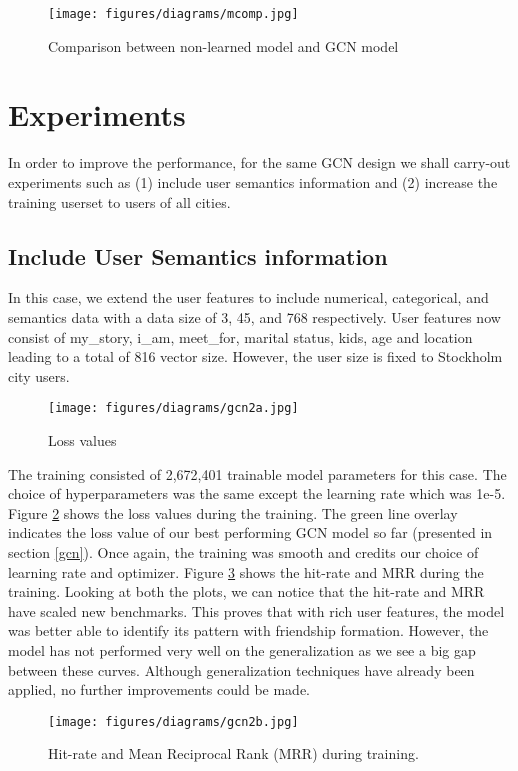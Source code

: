 \documentclass{kththesis}
\begin{document}
\begin{figure}[h!]
\centering
\texttt{[image: figures/diagrams/mcomp.jpg]}
\caption{Comparison between non-learned model and GCN model}
\label{fig:mcomp}
\end{figure}
\section{Experiments}
In order to improve the performance, for the same GCN design we shall carry-out experiments such as (1) include user semantics information and (2) increase the training userset to users of all cities.
\subsection{Include User Semantics information}
In this case, we extend the user features to include numerical, categorical, and semantics data with a data size of 3, 45, and 768 respectively. User features now consist of my\_story, i\_am, meet\_for, marital status, kids, age and location leading to a total of 816 vector size. However, the user size is fixed to Stockholm city users. \\

\begin{figure}[h!]
\centering
\texttt{[image: figures/diagrams/gcn2a.jpg]}
\caption{Loss values}
\label{fig:gcn2a}
\end{figure}

The training consisted of 2,672,401 trainable model parameters for this case. The choice of hyperparameters was the same except the learning rate which was 1e-5. Figure \ref{fig:gcn2a} shows the loss values during the training. The green line overlay indicates the loss value of our best performing GCN model so far (presented in section \ref{gcn}). Once again, the training was smooth and credits our choice of learning rate and optimizer. Figure \ref{fig:gcn2b} shows the hit-rate and MRR during the training. Looking at both the plots, we can notice that the hit-rate and MRR have scaled new benchmarks. This proves that with rich user features, the model was better able to identify its pattern with friendship formation. However, the model has not performed very well on the generalization as we see a big gap between these curves. Although generalization techniques have already been applied, no further improvements could be made. \\

\begin{figure}[h!]
\centering
\texttt{[image: figures/diagrams/gcn2b.jpg]}
\caption{Hit-rate and Mean Reciprocal Rank (MRR) during training.}
\label{fig:gcn2b}
\end{figure}
\end{document}
